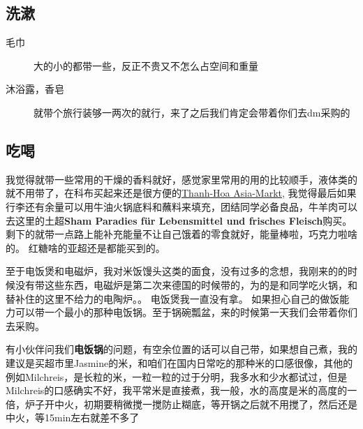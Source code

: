\documentclass[doku.tex]{subfiles}
\begin{document}
	\subsection{洗漱}
\begin{description}
		\item[毛巾] 大的小的都带一些，反正不贵又不怎么占空间和重量
		\item[沐浴露，香皂] 就带个旅行装够一两次的就行，来了之后我们肯定会带着你们去dm采购的
\end{description}

	\subsection{吃喝}
我觉得就带一些常用的干燥的香料就好，感觉家里常用的用的比较顺手，液体类的就不用带了，在科布买起来还是很方便的\href{http://www.thanh-hoa.de/}{Thanh-Hoa Asia-Markt}, 我觉得最后如果行李还有余量可以用牛油火锅底料和蘸料来填充，团结同学必备良品，牛羊肉可以去这里的土超\textbf{Sham Paradies für Lebensmittel und frisches Fleisch}购买。 剩下的就带一点路上能补充能量不让自己饿着的零食就好，能量棒啦，巧克力啦啥的。 红糖啥的亚超还是都能买到的。

至于电饭煲和电磁炉，我对米饭馒头这类的面食，没有过多的念想，我刚来的的时候没有带这些东西，电磁炉是第二次来德国的时候带的，为的是和同学吃火锅，和替补住的这里不给力的电陶炉。。 电饭煲我一直没有拿。 如果担心自己的做饭能力可以带一个最小的那种电饭锅。至于锅碗瓢盆，来的时候第一天我们会带着你们去采购。

有小伙伴问我们\textbf{电饭锅\label{Reis}}的问题，有空余位置的话可以自己带，如果想自己煮，我的建议是买超市里Jasmine的米，和咱们在国内日常吃的那种米的口感很像，其他的例如Milchreis，是长粒的米，一粒一粒的过于分明，我多水和少水都试过，但是Milchreis的口感确实不好，我平常米是直接煮，我一般，水的高度是米的高度的一倍，炉子开中火，初期要稍微搅一搅防止糊底，等开锅之后就不用搅了，然后还是中火，等15min左右就差不多了~
\end{document}
